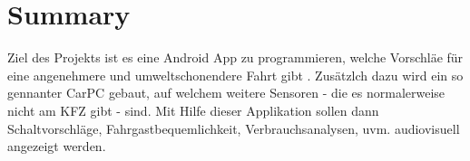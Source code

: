 \chapter{Summary}

Ziel des Projekts ist es eine Android App zu programmieren, welche Vorschläe für eine angenehmere und umweltschonendere Fahrt gibt . Zusätzlch dazu wird ein so gennanter CarPC gebaut, auf welchem weitere Sensoren - die es normalerweise nicht am KFZ gibt - sind. Mit Hilfe dieser Applikation sollen dann Schaltvorschläge, Fahrgastbequemlichkeit, Verbrauchsanalysen, uvm. audiovisuell angezeigt werden. 